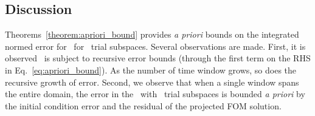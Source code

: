 \begin{comment}
Thus we have,
$$ \intSlabArg{n} \norm{ \stateROMSolArgt{n}{t} - \stateROMStarSolArgt{n}{t}} = \DeltaSlabArg{n} \errorArgt{n}{\timeStartArg{n}}.$$
Inserting the above into~\eqref{eq:boundtmp},
\begin{equation*}
\intSlabArg{n} \norm{\errorArgt{n}{t}} dt \le \DeltaSlabArg{n} \norm{\errorArgt{n}{\timeStartArg{n}}  }   + \lipshitzi \intSlabArg{n} \norm{ \resid(\stateFOMProjSolArgt{n}{t}) } dt.
\end{equation*}
\end{proof}
\end{comment}
\subsection{Discussion} 
Theorems~\ref{theorem:apriori_bound} provides \textit{a priori} bounds on the integrated normed error for \methodAcronym\ for \spatialAcronym\ trial subspaces. Several 
observations are made. First, it is observed \methodAcronym\ is subject to recursive error bounds (through the first term on the RHS in Eq.~\eqref{eq:apriori_bound}). As the number of time window grows, so does the recursive growth of error. Second, we observe that when a single window spans the entire domain, the error in the \methodAcronym\ with \spatialAcronym\ trial subspaces is bounded \textit{a priori} by the initial condition error and the residual of the projected FOM solution. 
%

